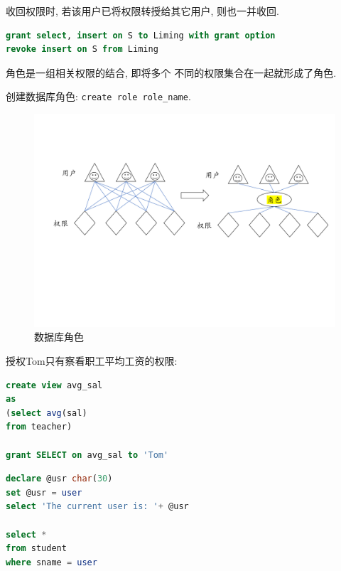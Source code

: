 收回权限时, 若该用户已将权限转授给其它用户, 则也一并收回.

\begin{lstlisting}[language=SQL]
grant select, insert on S to Liming with grant option
revoke insert on S from Liming
\end{lstlisting}

\begin{definition}[角色]
    角色是一组相关权限的结合, 即将多个
不同的权限集合在一起就形成了角色.
\end{definition}

创建数据库角色: \verb|create role role_name|.

\begin{figure}[H]
    \centering
    \includegraphics[width=.8\textwidth]{figure/角色.pdf}
    \caption{数据库角色}
\end{figure}

授权Tom只有察看职工平均工资的权限:
\begin{lstlisting}[language=SQL]
create view avg_sal
as
(select avg(sal)
from teacher)

grant SELECT on avg_sal to 'Tom'
\end{lstlisting}

\begin{lstlisting}[language=SQL, caption={普通员工只能查看自己的记录}]
declare @usr char(30)
set @usr = user
select 'The current user is: '+ @usr

select *
from student
where sname = user
\end{lstlisting}

